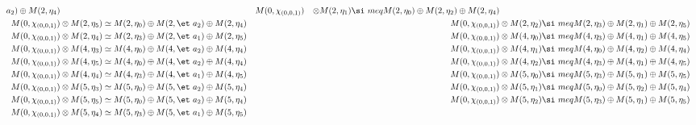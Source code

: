 \begin{align*}
a_{2}) \oplus M(2,\eta_{4}) &&& M(0,\chi_{(0,0,1)}) &\otimes M(2,\eta_{1}) \si\
meq M(2,\eta_{0}) \oplus M(2,\eta_{2}) \oplus M(2,\eta_{4})\\
M(0,\chi_{(0,0,1)}) &\otimes M(2,\eta_{5}) \simeq M(2,\eta_{0}) \oplus M(2,\et\
a_{2}) \oplus M(2,\eta_{4}) &&& M(0,\chi_{(0,0,1)}) &\otimes M(2,\eta_{2}) \si\
meq M(2,\eta_{3}) \oplus M(2,\eta_{1}) \oplus M(2,\eta_{5})\\
M(0,\chi_{(0,0,1)}) &\otimes M(2,\eta_{4}) \simeq M(2,\eta_{3}) \oplus M(2,\et\
a_{1}) \oplus M(2,\eta_{5}) &&& M(0,\chi_{(0,0,1)}) &\otimes M(4,\eta_{0}) \si\
meq M(4,\eta_{3}) \oplus M(4,\eta_{1}) \oplus M(4,\eta_{5})\\
M(0,\chi_{(0,0,1)}) &\otimes M(4,\eta_{3}) \simeq M(4,\eta_{0}) \oplus M(4,\et\
a_{2}) \oplus M(4,\eta_{4}) &&& M(0,\chi_{(0,0,1)}) &\otimes M(4,\eta_{1}) \si\
meq M(4,\eta_{0}) \oplus M(4,\eta_{2}) \oplus M(4,\eta_{4})\\
M(0,\chi_{(0,0,1)}) &\otimes M(4,\eta_{5}) \simeq M(4,\eta_{0}) \oplus M(4,\et\
a_{2}) \oplus M(4,\eta_{4}) &&& M(0,\chi_{(0,0,1)}) &\otimes M(4,\eta_{2}) \si\
meq M(4,\eta_{3}) \oplus M(4,\eta_{1}) \oplus M(4,\eta_{5})\\
M(0,\chi_{(0,0,1)}) &\otimes M(4,\eta_{4}) \simeq M(4,\eta_{3}) \oplus M(4,\et\
a_{1}) \oplus M(4,\eta_{5}) &&& M(0,\chi_{(0,0,1)}) &\otimes M(5,\eta_{0}) \si\
meq M(5,\eta_{3}) \oplus M(5,\eta_{1}) \oplus M(5,\eta_{5})\\
M(0,\chi_{(0,0,1)}) &\otimes M(5,\eta_{3}) \simeq M(5,\eta_{0}) \oplus M(5,\et\
a_{2}) \oplus M(5,\eta_{4}) &&& M(0,\chi_{(0,0,1)}) &\otimes M(5,\eta_{1}) \si\
meq M(5,\eta_{0}) \oplus M(5,\eta_{2}) \oplus M(5,\eta_{4})\\
M(0,\chi_{(0,0,1)}) &\otimes M(5,\eta_{5}) \simeq M(5,\eta_{0}) \oplus M(5,\et\
a_{2}) \oplus M(5,\eta_{4}) &&& M(0,\chi_{(0,0,1)}) &\otimes M(5,\eta_{2}) \si\
meq M(5,\eta_{3}) \oplus M(5,\eta_{1}) \oplus M(5,\eta_{5})\\
M(0,\chi_{(0,0,1)}) &\otimes M(5,\eta_{4}) \simeq M(5,\eta_{3}) \oplus M(5,\et\
a_{1}) \oplus M(5,\eta_{5})\\
\end{align*}

